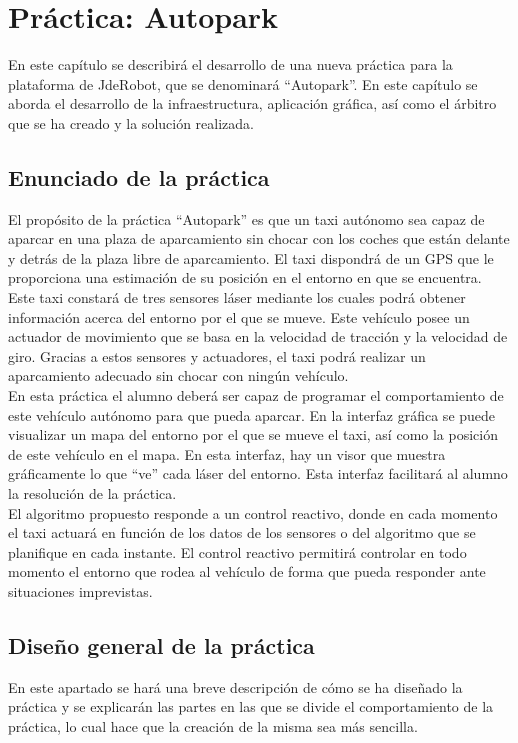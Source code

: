 \chapter{Práctica: Autopark}\label{cap.autoparking}
En este capítulo se describirá el desarrollo de una nueva práctica para la plataforma de JdeRobot, que se denominará ``Autopark''. En este capítulo se aborda el desarrollo de la infraestructura, aplicación gráfica, así como el árbitro que se ha creado y la solución realizada. \\

\section{Enunciado de la práctica}
El propósito de la práctica ``Autopark'' es que un taxi autónomo sea capaz de aparcar en una plaza de aparcamiento sin chocar con los coches que están delante y detrás de la plaza libre de aparcamiento. El taxi dispondrá de un GPS que le proporciona una estimación de su posición en el entorno en que se encuentra. Este taxi constará de tres sensores láser mediante los cuales podrá obtener información acerca del entorno por el que se mueve. Este vehículo posee un actuador de movimiento que se basa en la velocidad de tracción y la velocidad de giro. Gracias a estos sensores y actuadores, el taxi podrá realizar un aparcamiento adecuado sin chocar con ningún vehículo.\\

En esta práctica el alumno deberá ser capaz de programar el comportamiento de este vehículo autónomo para que pueda aparcar. En la interfaz gráfica se puede visualizar un mapa del entorno por el que se mueve el taxi, así como la posición de este vehículo en el mapa. En esta interfaz, hay un visor que muestra gráficamente lo que ``ve'' cada láser del entorno. Esta interfaz facilitará al alumno la resolución de la práctica.\\

El algoritmo propuesto responde a un control reactivo, donde en cada momento el taxi actuará en función de los datos de los sensores o del algoritmo que se planifique en cada instante. El control reactivo permitirá controlar en todo momento el entorno que rodea al vehículo de forma que pueda responder ante situaciones imprevistas.\\

\section{Diseño general de la práctica}
En este apartado se hará una breve descripción de cómo se ha diseñado la práctica y se explicarán las partes en las que se divide el comportamiento de la práctica, lo cual hace que la creación de la misma sea más sencilla.\\

